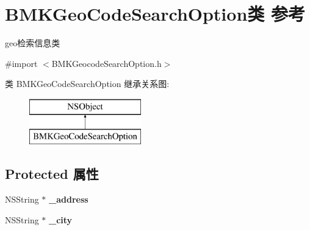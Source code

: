 \hypertarget{interface_b_m_k_geo_code_search_option}{}\section{B\+M\+K\+Geo\+Code\+Search\+Option类 参考}
\label{interface_b_m_k_geo_code_search_option}


geo检索信息类  




{\ttfamily \#import $<$B\+M\+K\+Geocode\+Search\+Option.\+h$>$}

类 B\+M\+K\+Geo\+Code\+Search\+Option 继承关系图\+:\begin{figure}[H]
\begin{center}
\leavevmode
\includegraphics[height=2.000000cm]{interface_b_m_k_geo_code_search_option}
\end{center}
\end{figure}
\subsection*{Protected 属性}
\begin{DoxyCompactItemize}
\item 
\hypertarget{interface_b_m_k_geo_code_search_option_ad60b7404c92ec2b83741da90bd9c6375}{}N\+S\+String $\ast$ {\bfseries \+\_\+address}\label{interface_b_m_k_geo_code_search_option_ad60b7404c92ec2b83741da90bd9c6375}

\item 
\hypertarget{interface_b_m_k_geo_code_search_option_a3cd2ae3510249ea055adaa246e7947c3}{}N\+S\+String $\ast$ {\bfseries \+\_\+city}\label{interface_b_m_k_geo_code_search_option_a3cd2ae3510249ea055adaa246e7947c3}

\end{DoxyCompactItemize}
